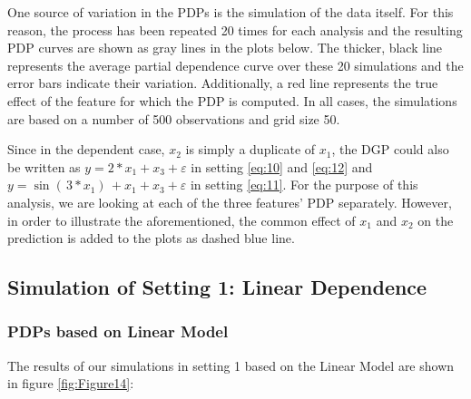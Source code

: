 \documentclass[]{krantz}
\begin{document}
One source of variation in the PDPs is the simulation of the data
itself. For this reason, the process has been repeated 20 times for each
analysis and the resulting PDP curves are shown as gray lines in the
plots below. The thicker, black line represents the average partial
dependence curve over these 20 simulations and the error bars indicate
their variation. Additionally, a red line represents the true effect of
the feature for which the PDP is computed. In all cases, the simulations
are based on a number of 500 observations and grid size 50.

Since in the dependent case, \(x_2\) is simply a duplicate of \(x_1\),
the DGP could also be written as \(y = 2*x_1 + x_3 + \varepsilon\) in
setting \eqref{eq:10} and \eqref{eq:12} and
\(y = \sin{( \, 3*x_1 ) \,} + x_1 + x_3 + \varepsilon\) in setting
\eqref{eq:11}. For the purpose of this analysis, we are looking at each of
the three features' PDP separately. However, in order to illustrate the
aforementioned, the common effect of \(x_1\) and \(x_2\) on the
prediction is added to the plots as dashed blue line.

\subsection{Simulation of Setting 1: Linear
Dependence}\label{simulation-of-setting-1-linear-dependence}

\subsubsection{PDPs based on Linear
Model}\label{pdps-based-on-linear-model}

The results of our simulations in setting 1 based on the Linear Model
are shown in figure \ref{fig:Figure14}:
\end{document}
